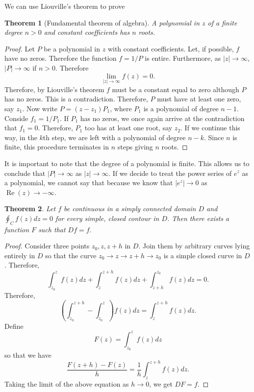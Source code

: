 \documentclass{article}
\theoremstyle{plain}
\newtheorem{thm}{Theorem}
\numberwithin{thm}{section}
\theoremstyle{plain}
\numberwithin{prop}{section}
\theoremstyle{plain}
\numberwithin{prop}{section}
\theoremstyle{definition}
\numberwithin{defn}{section}
\theoremstyle{remark}
\numberwithin{equation}{section}
\DeclareMathOperator{\re}{Re}
\begin{document}
We can use Liouville's theorem to prove
\begin{thm}[Fundamental theorem of algebra]\label{s4t5}
A polynomial in $z$ of a finite degree $n > 0$ and constant coefficients has 
$n$ roots.
\end{thm}
\begin{proof}
Let $P$ be a polynomial in $z$ with constant coefficients. Let, if possible, $f$
have no zeros. Therefore the function $f = 1/P$ is entire. Furthermore, as $|z|
\rightarrow \infty$, $|P| \rightarrow \infty$ if $n > 0$. Therefore 
\[
\lim_{|z| \rightarrow \infty} f(z) = 0.
\]
Therefore, by Liouville's theorem $f$ must be a constant equal to zero although
$P$ has no zeros. This is a contradiction. Therefore, $P$ must have at least
one zero, say $z_1$. Now write $P = (z - z_1)P_1$, where $P_1$ is a polynomial 
of degree $n - 1$. Conside $f_1 = 1/P_1$. If $P_1$ has no zeros, we once again
arrive at the contradiction that $f_1 = 0$. Therefore, $P_1$ too has at least
one root, say $z_2$. If we continue this way, in the $k$th step, we are left
with a polynomial of degree $n - k$. Since $n$ is finite, this procedure 
terminates in $n$ steps giving $n$ roots.
\end{proof}

It is important to note that the degree of a polynomial is finite. This allows
us to conclude that $|P| \rightarrow \infty$ as $|z| \rightarrow \infty$. If
we decide to treat the power series of $e^z$ as a polynomial, we cannot say
that because we know that $|e^z| \rightarrow 0$ as $\re(z) \rightarrow -\infty$.

\begin{thm}\label{s4t6}
Let $f$ be continuous in a simply connected domain $D$ and $\oint_C f(z)dz = 0$
for every simple, closed contour in $D$. Then there exists a function $F$ such
that $Df = f$.
\end{thm}
\begin{proof}
Consider three points $z_0, z, z+h$ in $D$. Join them by arbitrary curves lying
entirely in $D$ so that the curve $z_0 \rightarrow z \rightarrow z + h 
\rightarrow z_0$ is a simple closed curve in $D$. Therefore,
\[
\int_{z_0}^z f(z)dz + \int_z^{z + h}f(z)dz + \int_{z+h}^{z_0}f(z)dz = 0.
\]
Therefore,
\[
\left(\int_{z_0}^{z + h} - \int_{z_0}^z\right)f(z)dz = \int_z^{z + h}f(z)dz.
\]
Define
\[
F(z) = \int_{z_0}^z f(z)dz
\]
so that we have 
\[
\frac{F(z + h) - F(z)}{h} = \frac{1}{h}\int_z^{z+h}f(z)dz.
\]
Taking the limit of the above equation as $h \rightarrow 0$, we get $DF = f$.
\end{proof}
\end{document}
